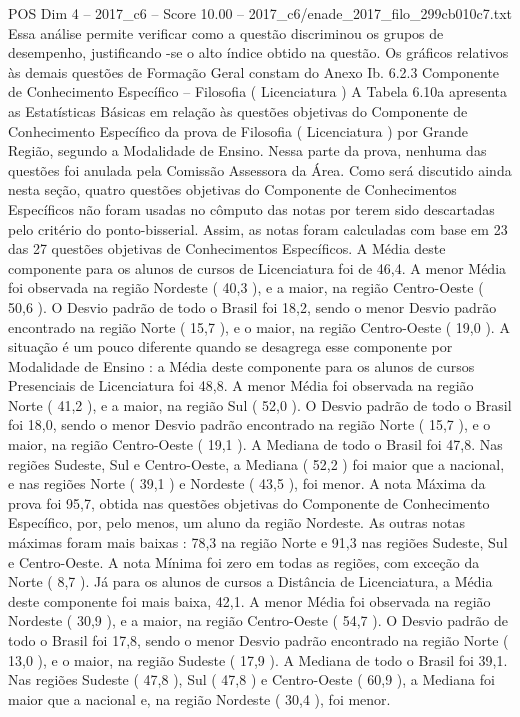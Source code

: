 \begin{textsample}{POS Dim 4 – 2017\_c6 – Score 10.00 – 2017\_c6/enade\_2017\_filo\_299cb010c7.txt}
Essa análise permite verificar como a questão discriminou os grupos de desempenho, justificando -se o alto índice obtido na questão.
Os gráficos relativos às demais questões de Formação Geral constam do Anexo Ib. 6.2.3 Componente de Conhecimento Específico – Filosofia ( Licenciatura ) A Tabela 6.10a apresenta as Estatísticas Básicas em relação às questões objetivas do Componente de Conhecimento Específico da prova de Filosofia ( Licenciatura ) por Grande Região, segundo a Modalidade de Ensino.
Nessa parte da prova, nenhuma das questões foi anulada pela Comissão Assessora da Área.
Como será discutido ainda nesta seção, quatro questões objetivas do Componente de Conhecimentos Específicos não foram usadas no cômputo das notas por terem sido descartadas pelo critério do ponto-bisserial.
Assim, as notas foram calculadas com base em 23 das 27 questões objetivas de Conhecimentos Específicos.
A Média deste componente para os alunos de cursos de Licenciatura foi de 46,4.
A menor Média foi observada na região Nordeste ( 40,3 ), e a maior, na região Centro-Oeste ( 50,6 ).
O Desvio padrão de todo o Brasil foi 18,2, sendo o menor Desvio padrão encontrado na região Norte ( 15,7 ), e o maior, na região Centro-Oeste ( 19,0 ).
A situação é um pouco diferente quando se desagrega esse componente por Modalidade de Ensino : a Média deste componente para os alunos de cursos Presenciais de Licenciatura foi 48,8.
A menor Média foi observada na região Norte ( 41,2 ), e a maior, na região Sul ( 52,0 ).
O Desvio padrão de todo o Brasil foi 18,0, sendo o menor Desvio padrão encontrado na região Norte ( 15,7 ), e o maior, na região Centro-Oeste ( 19,1 ).
A Mediana de todo o Brasil foi 47,8.
Nas regiões Sudeste, Sul e Centro-Oeste, a Mediana ( 52,2 ) foi maior que a nacional, e nas regiões Norte ( 39,1 ) e Nordeste ( 43,5 ), foi menor.
A nota Máxima da prova foi 95,7, obtida nas questões objetivas do Componente de Conhecimento Específico, por, pelo menos, um aluno da região Nordeste.
As outras notas máximas foram mais baixas : 78,3 na região Norte e 91,3 nas regiões Sudeste, Sul e Centro-Oeste.
A nota Mínima foi zero em todas as regiões, com exceção da Norte ( 8,7 ).
Já para os alunos de cursos a Distância de Licenciatura, a Média deste componente foi mais baixa, 42,1.
A menor Média foi observada na região Nordeste ( 30,9 ), e a maior, na região Centro-Oeste ( 54,7 ).
O Desvio padrão de todo o Brasil foi 17,8, sendo o menor Desvio padrão encontrado na região Norte ( 13,0 ), e o maior, na região Sudeste ( 17,9 ).
A Mediana de todo o Brasil foi 39,1.
Nas regiões Sudeste ( 47,8 ), Sul ( 47,8 ) e Centro-Oeste ( 60,9 ), a Mediana foi maior que a nacional e, na região Nordeste ( 30,4 ), foi menor.

\end{textsample}
